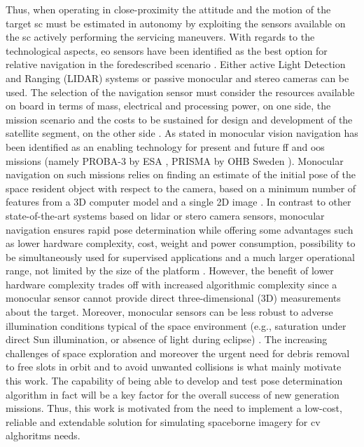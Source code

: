 Thus, when operating in close-proximity the attitude and the motion of the target \acrshort{sc} must be estimated in autonomy by exploiting the sensors available on the \acrshort{sc} actively performing the servicing maneuvers.
With regards to the technological aspects, \acrfull{eo} sensors have been identified as the best option for relative navigation in the foredescribed scenario \cite{Opromolla2017} \cite{pesciolino}.
Either active Light Detection and Ranging (LIDAR) systems or passive monocular and stereo cameras can be used. The selection of the navigation sensor must consider the resources available on board in terms of mass, electrical and processing power, on one side, the mission scenario and the costs to be sustained for design and development of the satellite segment, on the other side \cite{clerc2012astrium} \cite{pesciolino}.
As stated in \cite{Sharma2016} monocular vision navigation has been identified as an enabling technology for present and future \acrshort{ff} and \acrshort{oos} missions (namely PROBA-3 by ESA \cite{Casti2019}, PRISMA by OHB Sweden \cite{2013Damico}).
Monocular navigation on such missions relies on finding an estimate of the initial pose of the space resident object with respect to the camera, based on a minimum number of features from a 3D computer model and a single 2D image \cite{Sharma2016}.
In contrast to other state-of-the-art systems based on \acrfull{lidar} or stero camera sensors, monocular navigation ensures rapid pose determination while offering some advantages such as lower hardware complexity, cost, weight and power consumption, possibility to be simultaneously used for supervised applications and a much larger operational range, not limited by the size of the platform \cite{Sharma2018} \cite{2016Ventura} \cite{pesciolino}.
However, the benefit of lower hardware complexity trades off with increased algorithmic complexity since a monocular sensor cannot provide direct three-dimensional (3D) measurements about the target.
Moreover, monocular sensors can be less robust to adverse illumination conditions typical of the space environment \cite{Volpe2017} (e.g., saturation under direct Sun illumination, or absence of light during eclipse) \cite{pesciolino}.
The increasing challenges of space exploration and moreover the urgent need for debris removal to free slots in orbit and to avoid unwanted collisions is what mainly motivate this work.
The capability of being able to develop and test pose determination algorithm in fact will be a key factor for the overall success of new generation missions. Thus, this work is motivated from the need to implement a low-cost, reliable and extendable solution for simulating spaceborne imagery for \acrfull{cv} alghoritms needs.

